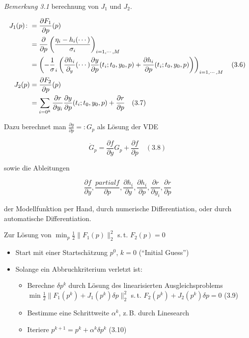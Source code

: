 \emph{Bemerkung 3.1} berechnung von $J_1$ und $J_2$.

\begin{align*}
J_1(p) \colon&= \frac{\partial F_1}{\partial p} (p) \\
&= \frac{\partial}{\partial p} \left( \frac{\eta_i - h_i(\cdots)}{\sigma_i} \right)_{i=1,\cdots,M} \\
&= \left( -\frac 1 \sigma_i \left( \frac{\partial h_i}{\partial_y} (\cdots) \frac{\partial y}{\partial p}(t_i; t_0, y_0, p) + \frac{\partial h_i}{\partial p} (t_i; t_0, y_0, p) \right) \right)_{i=1,\cdots,M} \quad (3.6)\\
J_2(p) &= \frac{\partial F_2}{\partial p} (p) \\
&= \sum_{i=0^k} \frac{\partial r}{\partial y_i} \frac{\partial y}{\partial p} (t_i; t_0, y_0, p) + \frac{\partial r}{\partial p} \quad (3.7)
\end{align*}

Dazu berechnet man $\tfrac{\partial y}{\partial p} =\colon G_p$ als Lösung der VDE

\[ \dot G_p = \frac{\partial f}{\partial y} G_p + \frac{\partial f}{\partial p} \quad (3.8)\]

sowie die Ableitungen

\[ \frac{\partial f}{\partial y}, \frac{partial f}{\partial p}, \frac{\partial h_i}{\partial y}, \frac{\partial h_i}{\partial p}, \frac{\partial r}{\partial y_i}, \frac{\partial r}{\partial p}\]

der Modellfunktion per Hand, durch numerische Differentiation, oder durch automatische Differentiation.


Zur Lösung von $\min_p \tfrac 12 \|F_1(p)\|_2^2$ s.\,t. $F_2(p) = 0$

\begin{itemize}
\item Start mit einer Startschätzung $p^0$, $k=0$ ("`Initial Guess"')
\item Solange ein Abbruchkriterium verletzt ist:
\begin{itemize}
\item Berechne $\delta p^k$ durch Lösung des linearisierten Ausgleichsproblems $\min \tfrac 12 \|F_1(p^k) + J_1(p^k) \delta p\|_2^2$ s.\,t. $F_2(p^k) + J_2(p^k) \delta p = 0$ (3.9)
\item Bestimme eine Schrittweite $\alpha^k$, z.\,B. durch Linesearch 
\item Iteriere $p^{k+1} = p^k + \alpha^k \delta p^k$ (3.10)
\end{itemize} 
\end{itemize}

